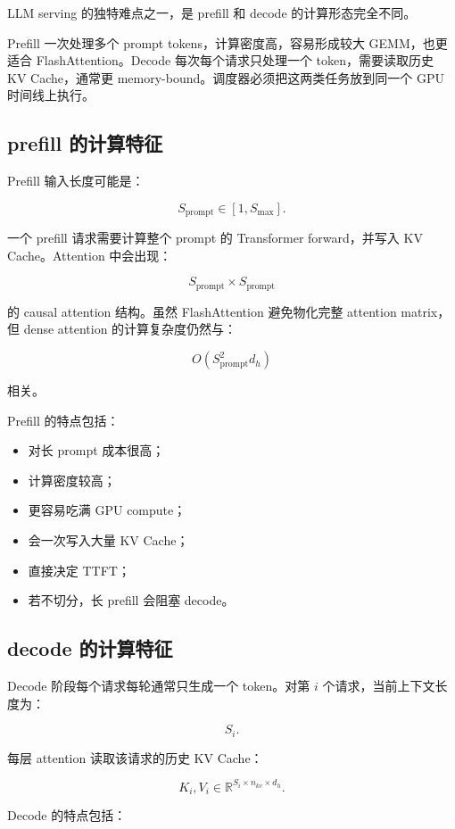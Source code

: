 LLM serving 的独特难点之一，是 prefill 和 decode 的计算形态完全不同。

Prefill 一次处理多个 prompt tokens，计算密度高，容易形成较大 GEMM，也更适合 FlashAttention。Decode 每次每个请求只处理一个 token，需要读取历史 KV Cache，通常更 memory-bound。调度器必须把这两类任务放到同一个 GPU 时间线上执行。

\subsection{prefill 的计算特征}
\label{subsec:prefill-computation-characteristics}

Prefill 输入长度可能是：

\[
S_{\mathrm{prompt}}\in[1,S_{\max}].
\]

一个 prefill 请求需要计算整个 prompt 的 Transformer forward，并写入 KV Cache。Attention 中会出现：

\[
S_{\mathrm{prompt}}\times S_{\mathrm{prompt}}
\]

的 causal attention 结构。虽然 FlashAttention 避免物化完整 attention matrix，但 dense attention 的计算复杂度仍然与：

\[
O(S_{\mathrm{prompt}}^2d_h)
\]

相关。

Prefill 的特点包括：

\begin{itemize}
\item 对长 prompt 成本很高；
\item 计算密度较高；
\item 更容易吃满 GPU compute；
\item 会一次写入大量 KV Cache；
\item 直接决定 TTFT；
\item 若不切分，长 prefill 会阻塞 decode。
\end{itemize}

\subsection{decode 的计算特征}
\label{subsec:decode-computation-characteristics}

Decode 阶段每个请求每轮通常只生成一个 token。对第 $i$ 个请求，当前上下文长度为：

\[
S_i.
\]

每层 attention 读取该请求的历史 KV Cache：

\[
K_i,V_i\in\mathbb{R}^{S_i\times n_{kv}\times d_h}.
\]

Decode 的特点包括：

